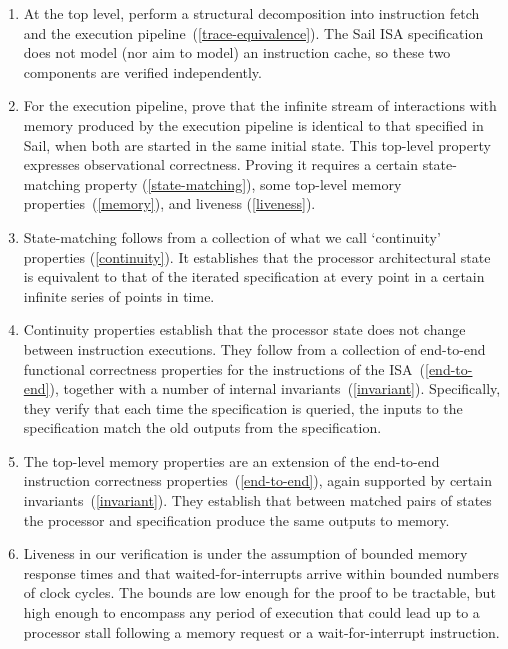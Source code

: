 \documentclass[10pt,conference]{IEEEtran}
\begin{document}
\begin{enumerate}
  \item At the top level, perform a structural decomposition into
    instruction fetch and the execution
    pipeline~(\ref{trace-equivalence}). The Sail ISA specification does
    not model (nor aim to model) an instruction cache, so these two components
    are verified independently.
  \item \label{trace-equivalence} For the execution pipeline, prove that
    the infinite stream of interactions with memory produced by the
    execution pipeline is identical to that specified in Sail, when both
    are started in the same initial state. This top-level property
    expresses observational correctness.  Proving it requires a certain
    state-matching property (\ref{state-matching}), some top-level memory
    properties~(\ref{memory}), and liveness (\ref{liveness}).
  \item \label{state-matching} State-matching follows from a collection of
    what we call `continuity' properties (\ref{continuity}). It establishes
    that the processor architectural state is equivalent to that of the
    iterated specification at every point in a certain infinite series of
    points in time.
  \item \label{continuity} Continuity properties establish that the processor
    state does not change between instruction executions. They follow from
    a collection of end-to-end functional correctness properties for the
    instructions of the ISA~(\ref{end-to-end}), together with a number of
    internal invariants~(\ref{invariant}). Specifically, they verify that each time the
    specification is queried, the inputs to the specification match the
    old outputs from the specification.
  \item \label{memory} The top-level memory properties are an
    extension of the end-to-end instruction correctness
    properties~(\ref{end-to-end}), again supported by certain
    invariants~(\ref{invariant}). They establish that between matched pairs of states
    the processor and specification produce the same outputs to memory.
  \item \label{liveness} Liveness in our verification is under the
    assumption of bounded memory response times and that waited-for-interrupts
    arrive within bounded numbers of clock cycles. The bounds
    are low enough for the proof to be tractable, but high enough to
    encompass any period of execution that could lead up to a processor
    stall following a memory request or a wait-for-interrupt instruction.

\end{enumerate}
\end{document}

